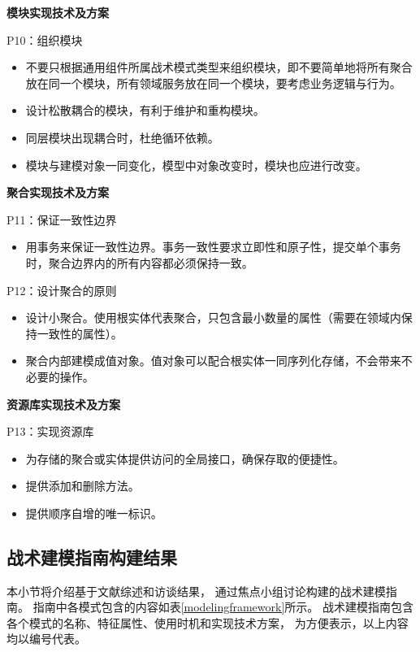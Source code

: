 \textbf{模块实现技术及方案}

P10：组织模块
\begin{itemize}[leftmargin = 40pt]
    \item 不要只根据通用组件所属战术模式类型来组织模块，即不要简单地将所有聚合放在同一个模块，所有领域服务放在同一个模块，要考虑业务逻辑与行为。
    \item 设计松散耦合的模块，有利于维护和重构模块。
    \item 同层模块出现耦合时，杜绝循环依赖。
    \item 模块与建模对象一同变化，模型中对象改变时，模块也应进行改变。
\end{itemize}

\textbf{聚合实现技术及方案}

P11：保证一致性边界
\begin{itemize}[leftmargin = 40pt]
    \item 用事务来保证一致性边界。事务一致性要求立即性和原子性，提交单个事务时，聚合边界内的所有内容都必须保持一致。
\end{itemize}

P12：设计聚合的原则
\begin{itemize}[leftmargin = 40pt]
    \item 设计小聚合。使用根实体代表聚合，只包含最小数量的属性（需要在领域内保持一致性的属性）。
    \item 聚合内部建模成值对象。值对象可以配合根实体一同序列化存储，不会带来不必要的操作。
\end{itemize}

\textbf{资源库实现技术及方案}

P13：实现资源库
\begin{itemize}[leftmargin = 40pt]
    \item 为存储的聚合或实体提供访问的全局接口，确保存取的便捷性。
    \item 提供添加和删除方法。
    \item 提供顺序自增的唯一标识。
\end{itemize}

\subsection{战术建模指南构建结果}

本小节将介绍基于文献综述和访谈结果，
通过焦点小组讨论构建的战术建模指南。
指南中各模式包含的内容如表\ref{modelingframework}所示。
战术建模指南包含各个模式的名称、特征属性、使用时机和实现技术方案，
为方便表示，以上内容均以编号代表。


